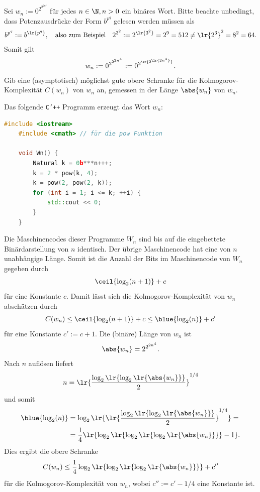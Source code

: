 \begin{questions}
	\question[2] Sei $w_n := 0^{2^{2^{2n^4}}}$ für jedes $n\in\N, n>0$ ein binäres Wort. Bitte beachte unbedingt, dass Potenzausdrücke der Form $b^{p^q}$ gelesen werden müssen als
	\begin{align*}
		b^{p^q} := b^{\lr{p^q}}, \quad \text{also zum Beispiel} \quad 2^{3^2} := 2^{\lr{3^2}} = 2^9 = 512 \neq \lr{2^3}^2 = 8^2 = 64.
	\end{align*}
	Somit gilt
	\begin{align*}
		w_n := 0^{2^{2^{2n^4}}} := 0^{2^{\lr{2^{\lr{2n^4}}}}}.
	\end{align*}
	Gib eine (asymptotisch) möglichst gute obere Schranke für die Kolmogorov-Komplexität $C(w_n)$ von $w_n$ an, gemessen in der Länge $\abs{w_n}$ von $w_n$.
	\begin{solution}
		Das folgende \texttt{C'++} Programm erzeugt das Wort $w_n$:
		\begin{lstlisting}[language=C++,caption=$W_n$]
    #include <iostream>
    #include <cmath> // für die pow Funktion
    
    void Wn() {
		Natural k = 0b***n+++;
		k = 2 * pow(k, 4);
		k = pow(2, pow(2, k));
        for (int i = 1; i <= k; ++i) {
            std::cout << 0;
        }
    }
\end{lstlisting}
		Die Maschinencodes dieser Programme $W_n$ sind bis auf die eingebettete Binärdarstellung von $n$ identisch. Der übrige Maschinencode hat eine von $n$ unabhängige Länge. Somit ist die Anzahl der Bits im Maschinencode von $W_n$ gegeben durch
		\begin{align*}
			\ceil{\log_2(n+1)} + c
		\end{align*}
		für eine Konstante $c$. Damit lässt sich die Kolmogorov-Komplexität von $w_n$ abschätzen durch
		\begin{align*}
			C(w_n) \leq \ceil{\log_2(n+1)} + c \leq \blue{\log_2(n)} + c'
		\end{align*}
		für eine Konstante $c' := c + 1$. Die (binäre) Länge von $w_n$ ist
		\begin{align*}
			\abs{w_n} = 2^{2^{2n^4}}.
		\end{align*}
		Nach $n$ auflösen liefert
		\begin{align*}
			n = \lr{\frac{\log_2\lr{\log_2\lr{\abs{w_n}}}}{2}}^{1/4}
		\end{align*}
		und somit
		\begin{align*}
			\blue{\log_2(n)} & = \log_2\lr{\lr{\frac{\log_2\lr{\log_2\lr{\abs{w_n}}}}{2}}^{1/4}} = \\
			                 & = \frac{1}{4}\lr{\log_2\lr{\log_2\lr{\log_2\lr{\abs{w_n}}}}-1}.
		\end{align*}
		Dies ergibt die obere Schranke
		\begin{align*}
			C(w_n) \leq \frac{1}{4}\log_2\lr{\log_2\lr{\log_2\lr{\abs{w_n}}}} + c''
		\end{align*}
		für die Kolmogorov-Komplexität von $w_n$, wobei $c'':=c'-1/4$ eine Konstante ist.
	\end{solution}


\end{questions}
